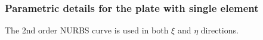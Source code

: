 \documentclass[11pt]{article}
\begin{document}
\subsubsection{Parametric details for the plate with single element}
\label{ParametricDeatils1Elem}
The 2nd order NURBS curve is used in both $\xi$ and $\eta$ directions. \\

\end{document}
